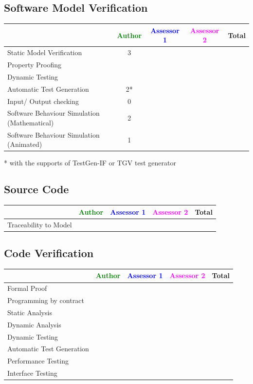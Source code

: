 \subsection{Software Model Verification	}


\begin{tabular}{|l | c | c | c | c|}
\hline
& \textcolor{green}{Author} & \textcolor{blue}{Assessor 1} & \textcolor{magenta}{Assessor 2} & Total \\
\hline 
Static Model Verification & 3 & & &  \\
\hline
Property Proofing & & & &  \\
\hline
Dynamic Testing & & & &  \\
\hline
Automatic Test Generation & 2* & & &  \\
\hline
Input/ Output checking & 0 & & &  \\
\hline
Software Behaviour Simulation (Mathematical) & 2 & & &  \\
\hline
Software Behaviour Simulation (Animated) & 1 & & &  \\
\hline
\end{tabular}


\begin{author_comment}
	* with the supports of TestGen-IF or TGV test generator
\end{author_comment}

\subsection{Source Code}


\begin{tabular}{|l | c | c | c | c|}
\hline
& \textcolor{green}{Author} & \textcolor{blue}{Assessor 1} & \textcolor{magenta}{Assessor 2} & Total \\
\hline 
Traceability to Model & & & &  \\
\hline
\end{tabular}


\subsection{Code Verification	}


\begin{tabular}{|l | c | c | c | c|}
\hline
& \textcolor{green}{Author} & \textcolor{blue}{Assessor 1} & \textcolor{magenta}{Assessor 2} & Total \\
\hline 
Formal Proof & & & &  \\
\hline
Programming by contract & & & &  \\
\hline
Static Analysis & & & &  \\
\hline
Dynamic Analysis & & & &  \\
\hline
Dynamic Testing & & & &  \\
\hline
Automatic Test Generation & & & &  \\
\hline
Performance Testing & & & &  \\
\hline
Interface Testing & & & &  \\
\hline
\end{tabular}

